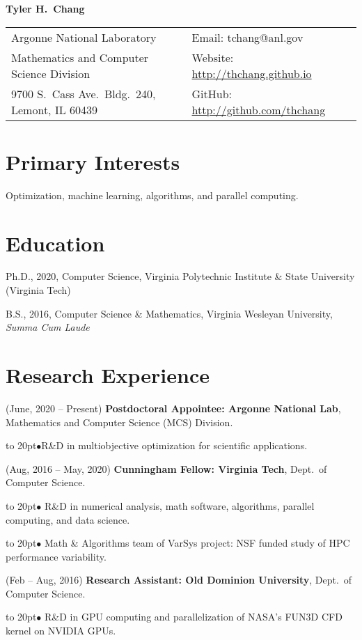 \documentclass[12pt]{article}
\def\bullitem{\par\hangindent=15pt \hangafter=1
\noindent\hbox to 20pt{\hfil$\bullet$\hfil}\ignorespaces}
\begin{document}
{\Large \textbf{Tyler H.\ Chang}}

\begin{tabular}{ll}
   Argonne National Laboratory & Email: tchang@anl.gov\\
   Mathematics and Computer Science Division
      & Website: \url{http://thchang.github.io}\\
   9700 S.\ Cass Ave.\ Bldg.\ 240, Lemont, IL 60439
      & GitHub: \url{http://github.com/thchang} \\
\end{tabular}

\section*{Primary Interests}

Optimization, machine learning, algorithms, and parallel computing.

\section*{Education}

Ph.D., 2020, Computer Science,
Virginia Polytechnic Institute \& State University
(Virginia Tech)

\medskip

B.S., 2016, Computer Science \& Mathematics,
Virginia Wesleyan University, \textit{Summa Cum Laude}

\section*{Research Experience}

\hangindent=0.3in
(June, 2020 -- Present)
\textbf{Postdoctoral Appointee: Argonne National Lab},
Mathematics and Computer Science (MCS) Division.
\bullitem R\&D in multiobjective optimization for scientific applications.

\medskip

\hangindent=0.3in
(Aug, 2016 -- May, 2020)
\textbf{Cunningham Fellow: Virginia Tech},
Dept.\ of Computer Science.
\bullitem
R\&D in numerical analysis, math software,
algorithms, parallel computing, and data science.
\bullitem
Math \& Algorithms team of VarSys project: NSF funded study of
HPC performance variability.

\medskip

\hangindent=0.3in
(Feb -- Aug, 2016)
\textbf{Research Assistant: Old Dominion University},
Dept.\ of Computer Science.
\bullitem
R\&D in GPU computing and parallelization of NASA's FUN3D CFD kernel on
NVIDIA GPUs.
\end{document}
